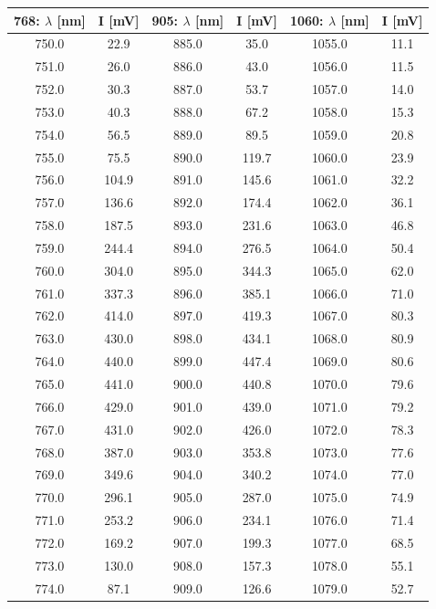 \documentclass[]{article}
\begin{document}
\begin{table}[H]
\centering
\begin{tabular}{|c|c||c|c||c|c|}
\hline
768: $\lambda$ [nm] & I [mV] & 905: $\lambda$ [nm] & I [mV] & 1060: $\lambda$ [nm] & I [mV] \\ \hline\hline
750.0 & 22.9 & 885.0 & 35.0 & 1055.0 & 11.1 \\ \hline
751.0 & 26.0 & 886.0 & 43.0 & 1056.0 & 11.5 \\ \hline
752.0 & 30.3 & 887.0 & 53.7 & 1057.0 & 14.0 \\ \hline
753.0 & 40.3 & 888.0 & 67.2 & 1058.0 & 15.3 \\ \hline
754.0 & 56.5 & 889.0 & 89.5 & 1059.0 & 20.8 \\ \hline
755.0 & 75.5 & 890.0 & 119.7 & 1060.0 & 23.9 \\ \hline
756.0 & 104.9 & 891.0 & 145.6 & 1061.0 & 32.2 \\ \hline
757.0 & 136.6 & 892.0 & 174.4 & 1062.0 & 36.1 \\ \hline
758.0 & 187.5 & 893.0 & 231.6 & 1063.0 & 46.8 \\ \hline
759.0 & 244.4 & 894.0 & 276.5 & 1064.0 & 50.4 \\ \hline
760.0 & 304.0 & 895.0 & 344.3 & 1065.0 & 62.0 \\ \hline
761.0 & 337.3 & 896.0 & 385.1 & 1066.0 & 71.0 \\ \hline
762.0 & 414.0 & 897.0 & 419.3 & 1067.0 & 80.3 \\ \hline
763.0 & 430.0 & 898.0 & 434.1 & 1068.0 & 80.9 \\ \hline
764.0 & 440.0 & 899.0 & 447.4 & 1069.0 & 80.6 \\ \hline
765.0 & 441.0 & 900.0 & 440.8 & 1070.0 & 79.6 \\ \hline
766.0 & 429.0 & 901.0 & 439.0 & 1071.0 & 79.2 \\ \hline
767.0 & 431.0 & 902.0 & 426.0 & 1072.0 & 78.3 \\ \hline
768.0 & 387.0 & 903.0 & 353.8 & 1073.0 & 77.6 \\ \hline
769.0 & 349.6 & 904.0 & 340.2 & 1074.0 & 77.0 \\ \hline
770.0 & 296.1 & 905.0 & 287.0 & 1075.0 & 74.9 \\ \hline
771.0 & 253.2 & 906.0 & 234.1 & 1076.0 & 71.4 \\ \hline
772.0 & 169.2 & 907.0 & 199.3 & 1077.0 & 68.5 \\ \hline
773.0 & 130.0 & 908.0 & 157.3 & 1078.0 & 55.1 \\ \hline
774.0 & 87.1 & 909.0 & 126.6 & 1079.0 & 52.7 \\ \hline

\end{tabular}
\end{table}
\end{document}
